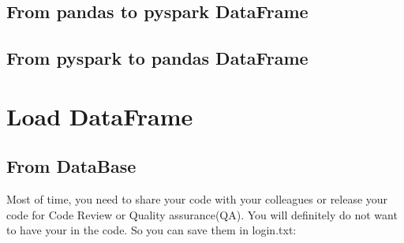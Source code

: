 \documentclass[letterpaper,12pt,english]{sphinxmanual}
\begin{document}
\subsection{From pandas to pyspark DataFrame}
\label{\detokenize{pdrdd:from-pandas-to-pyspark-dataframe}}
\sphinxAtStartPar
{}

\begin{sphinxVerbatim}[commandchars=\\\{\}]
  
  
\end{sphinxVerbatim}


\subsection{From pyspark to pandas DataFrame}
\label{\detokenize{pdrdd:from-pyspark-to-pandas-dataframe}}
\sphinxAtStartPar
{}

\begin{sphinxVerbatim}[commandchars=\\\{\}]
  
\end{sphinxVerbatim}


\section{Load DataFrame}
\label{\detokenize{pdrdd:load-dataframe}}

\subsection{From DataBase}
\label{\detokenize{pdrdd:from-database}}
\sphinxAtStartPar
Most of time, you need to share your code with your colleagues or release your code for Code Review or Quality assurance(QA). You will definitely do not want to have your  in the code. So you can save them
in login.txt:
\end{document}
